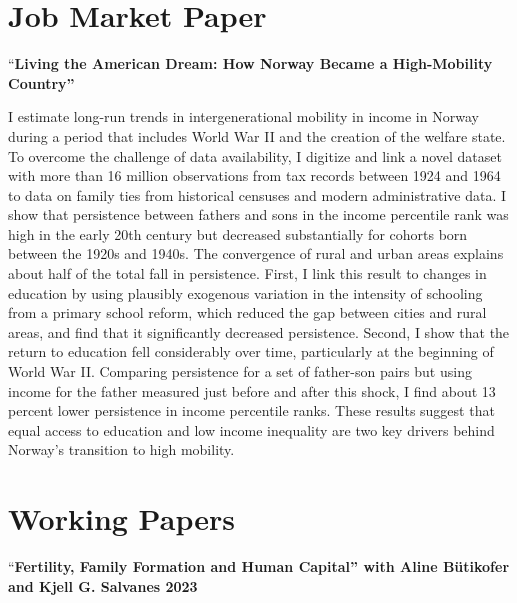 \documentclass[11pt,]{article}
\begin{document}
\hypertarget{job-market-paper}{%
\section{Job Market Paper}\label{job-market-paper}}

``\textbf{Living the American Dream: How Norway Became a High-Mobility
Country''}

I estimate long-run trends in intergenerational mobility in income in
Norway during a period that includes World War II and the creation of
the welfare state. To overcome the challenge of data availability, I
digitize and link a novel dataset with more than 16 million observations
from tax records between 1924 and 1964 to data on family ties from
historical censuses and modern administrative data. I show that
persistence between fathers and sons in the income percentile rank was
high in the early 20th century but decreased substantially for cohorts
born between the 1920s and 1940s. The convergence of rural and urban
areas explains about half of the total fall in persistence. First, I
link this result to changes in education by using plausibly exogenous
variation in the intensity of schooling from a primary school reform,
which reduced the gap between cities and rural areas, and find that it
significantly decreased persistence. Second, I show that the return to
education fell considerably over time, particularly at the beginning of
World War II. Comparing persistence for a set of father-son pairs but
using income for the father measured just before and after this shock, I
find about 13 percent lower persistence in income percentile ranks.
These results suggest that equal access to education and low income
inequality are two key drivers behind Norway's transition to high
mobility. \vspace{0.3cm}\vspace{-0.2cm}

\vspace{0.5cm}

\clearpage

\hypertarget{working-papers}{%
\section{Working Papers}\label{working-papers}}

``\textbf{Fertility, Family Formation and Human Capital'' with Aline
Bütikofer and Kjell G. Salvanes \hfill 2023}
\end{document}
